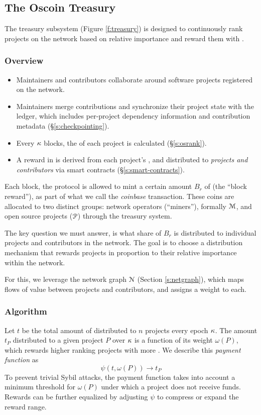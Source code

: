 \subsection{The Oscoin Treasury}
\label{s:treasury}

The treasury subsystem (Figure \ref{f:treasury}) is designed to continuously
rank projects on the network based on relative importance and reward them with
\oscoin{}.

\subsubsection{Overview}

\begin{itemize}
    \item Maintainers and contributors collaborate around software projects
        registered on the network.
    \item Maintainers merge contributions and synchronize their project state
        with the ledger, which includes per-project dependency information and
        contribution metadata (\S\ref{s:checkpointing}).
    \item Every $\kappa$ blocks, the \osrank{} of each project is calculated
        (\S\ref{s:osrank}).
    \item A reward in \oscoin{} is derived from each project's \osrank{},
        and distributed to \emph{projects and contributors} via smart
        contracts (\S\ref{s:smart-contracts}).
\end{itemize}

\medskip

\noindent Each block, the protocol is allowed to mint a certain amount $B_r$ of \oscoin{}
(the ``block reward''), as part of what we call the \emph{coinbase}
transaction. These coins are allocated to two distinct groups: network
operators (``miners''), formally $\mathcal{M}$, and open source projects ($\mathcal{P}$)
through the treasury system.

The key question we must answer, is what share of $B_r$ is distributed to
individual projects and contributors in the network.  The goal is to choose
a distribution mechanism that rewards projects in proportion to their relative
importance within the network.

For this, we leverage the \oscoin{} network graph $\mathcal{N}$ (Section
\ref{s:netgraph}), which maps flows of value between projects and contributors,
and assigns a weight to each.

\subsubsection{Algorithm} Let $t$ be the total amount of \oscoin{} distributed
to $n$ projects every epoch $\kappa$. The amount $t_P$ distributed to a given
project $P$ over $\kappa$ is a function of its \osrank{} weight $\omega(P)$,
which rewards higher ranking projects with more \oscoin{}. We describe this
\emph{payment function} as
\[
    \psi(t, \omega(P)) \to t_P
\]
To prevent trivial Sybil attacks, the payment function takes
into account a minimum threshold for $\omega(P)$ under which a project does not
receive funds. Rewards can be further equalized by adjusting $\psi$ to
compress or expand the reward range.

